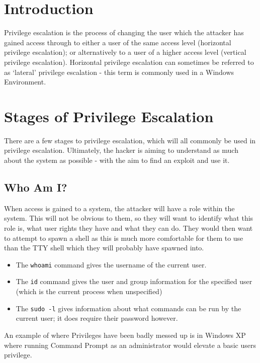 
\section{Introduction}
Privilege escalation is the process of changing the user which the attacker has gained access through to either a user of the same access level (horizontal privilege escalation); or alternatively to a user of a higher access level (vertical privilege escalation). Horizontal privilege escalation can sometimes be referred to as `lateral' privilege escalation - this term is commonly used in a Windows Environment. 

\section{Stages of Privilege Escalation}
There are a few stages to privilege escalation, which will all commonly be used in privilege escalation. Ultimately, the hacker is aiming to understand as much about the system as possible - with the aim to find an exploit and use it.

\subsection{Who Am I?}
When access is gained to a system, the attacker will have a role within the system. This will not be obvious to them, so they will want to identify what this role is, what user rights they have and what they can do. They would then want to attempt to spawn a shell as this is much more comfortable for them to use than the TTY shell which they will probably have spawned into.
\begin{itemize}
    \item The \verb|whoami| command gives the username of the current user.
    \item The \verb|id| command gives the user and group information for the specified user (which is the current process when unspecified)
    \item The \verb|sudo -l| gives information about what commands can be run by the current user; it does require their password however.
\end{itemize}

An example of where Privileges have been badly messed up is in Windows XP where running Command Prompt as an administrator would elevate a basic users privilege.

